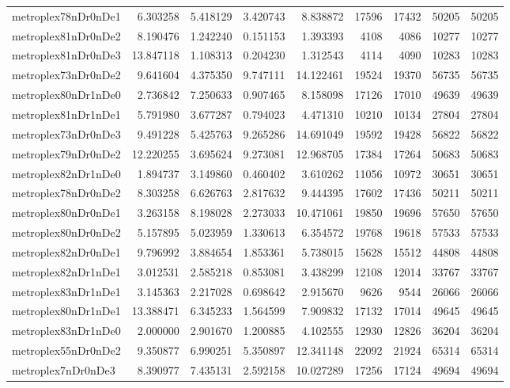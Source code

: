 \begin{longtable}{|l|r|r|r|r|r|r|r|r|}
metroplex78nDr0nDe1 & 6.303258 & 5.418129 & 3.420743 & 8.838872 & 17596 & 17432 & 50205 & 50205 \\
metroplex81nDr0nDe2 & 8.190476 & 1.242240 & 0.151153 & 1.393393 & 4108 & 4086 & 10277 & 10277 \\
metroplex81nDr0nDe3 & 13.847118 & 1.108313 & 0.204230 & 1.312543 & 4114 & 4090 & 10283 & 10283 \\
metroplex73nDr0nDe2 & 9.641604 & 4.375350 & 9.747111 & 14.122461 & 19524 & 19370 & 56735 & 56735 \\
metroplex80nDr1nDe0 & 2.736842 & 7.250633 & 0.907465 & 8.158098 & 17126 & 17010 & 49639 & 49639 \\
metroplex81nDr1nDe1 & 5.791980 & 3.677287 & 0.794023 & 4.471310 & 10210 & 10134 & 27804 & 27804 \\
metroplex73nDr0nDe3 & 9.491228 & 5.425763 & 9.265286 & 14.691049 & 19592 & 19428 & 56822 & 56822 \\
metroplex79nDr0nDe2 & 12.220255 & 3.695624 & 9.273081 & 12.968705 & 17384 & 17264 & 50683 & 50683 \\
metroplex82nDr1nDe0 & 1.894737 & 3.149860 & 0.460402 & 3.610262 & 11056 & 10972 & 30651 & 30651 \\
metroplex78nDr0nDe2 & 8.303258 & 6.626763 & 2.817632 & 9.444395 & 17602 & 17436 & 50211 & 50211 \\
metroplex80nDr0nDe1 & 3.263158 & 8.198028 & 2.273033 & 10.471061 & 19850 & 19696 & 57650 & 57650 \\
metroplex80nDr0nDe2 & 5.157895 & 5.023959 & 1.330613 & 6.354572 & 19768 & 19618 & 57533 & 57533 \\
metroplex82nDr0nDe1 & 9.796992 & 3.884654 & 1.853361 & 5.738015 & 15628 & 15512 & 44808 & 44808 \\
metroplex82nDr1nDe1 & 3.012531 & 2.585218 & 0.853081 & 3.438299 & 12108 & 12014 & 33767 & 33767 \\
metroplex83nDr1nDe1 & 3.145363 & 2.217028 & 0.698642 & 2.915670 & 9626 & 9544 & 26066 & 26066 \\
metroplex80nDr1nDe1 & 13.388471 & 6.345233 & 1.564599 & 7.909832 & 17132 & 17014 & 49645 & 49645 \\
metroplex83nDr1nDe0 & 2.000000 & 2.901670 & 1.200885 & 4.102555 & 12930 & 12826 & 36204 & 36204 \\
metroplex55nDr0nDe2 & 9.350877 & 6.990251 & 5.350897 & 12.341148 & 22092 & 21924 & 65314 & 65314 \\
metroplex7nDr0nDe3 & 8.390977 & 7.435131 & 2.592158 & 10.027289 & 17256 & 17124 & 49694 & 49694 \\

\end{longtable}
